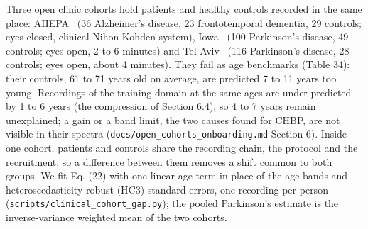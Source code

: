 \documentclass[11pt,a4paper]{article}
\begin{document}
Three open clinic cohorts hold patients and healthy controls recorded in the same place: AHEPA~\citep{miltiadous2023ahepa} (36 Alzheimer's disease, 23 frontotemporal dementia, 29 controls; eyes closed, clinical Nihon Kohden system), Iowa~\citep{singh2023iowapd} (100 Parkinson's disease, 49 controls; eyes open, 2 to 6 minutes) and Tel Aviv~\citep{katzir2026telavivpd} (116 Parkinson's disease, 28 controls; eyes open, about 4 minutes). They fail as age benchmarks (Table 34): their controls, 61 to 71 years old on average, are predicted 7 to 11 years too young. Recordings of the training domain at the same ages are under-predicted by 1 to 6 years (the compression of Section 6.4), so 4 to 7 years remain unexplained; a gain or a band limit, the two causes found for CHBP, are not visible in their spectra (\texttt{docs/open\_cohorts\_onboarding.md} Section 6). Inside one cohort, patients and controls share the recording chain, the protocol and the recruitment, so a difference between them removes a shift common to both groups. We fit Eq. (22) with one linear age term in place of the age bands and heteroscedasticity-robust (HC3) standard errors, one recording per person (\texttt{scripts/clinical\_cohort\_gap.py}); the pooled Parkinson's estimate is the inverse-variance weighted mean of the two cohorts.

\begin{table}[t]
\centering
\small
\caption{Adjusted gap of each patient group against the controls of its own cohort: $\beta$ of Eq. (22) in years with a 95 \% interval, and p.}
\end{table}
\end{document}
